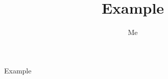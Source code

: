 \documentclass{article}
\begin{document}
    \title{Example}
    \author{Me}
    \maketitle
    Example
\end{document}
